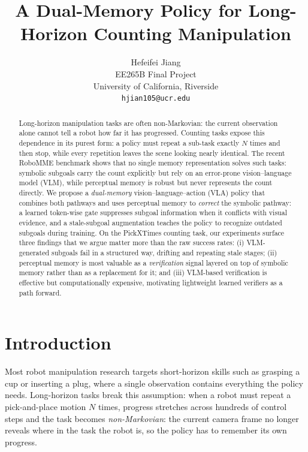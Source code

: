 \documentclass{article}
\title{A Dual-Memory Policy for Long-Horizon Counting Manipulation}
\author{
  Hefeifei Jiang\\
  EE265B Final Project\\
  University of California, Riverside\\
  \texttt{hjian105@ucr.edu}
}
\begin{document}
\maketitle


\begin{abstract}
Long-horizon manipulation tasks are often non-Markovian: the current observation alone cannot tell a robot how far it has progressed. Counting tasks expose this dependence in its purest form: a policy must repeat a sub-task exactly $N$ times and then stop, while every repetition leaves the scene looking nearly identical. The recent RoboMME benchmark shows that no single memory representation solves such tasks: symbolic subgoals carry the count explicitly but rely on an error-prone vision--language model (VLM), while perceptual memory is robust but never represents the count directly. We propose a \emph{dual-memory} vision--language--action (VLA) policy that combines both pathways and uses perceptual memory to \emph{correct} the symbolic pathway: a learned token-wise gate suppresses subgoal information when it conflicts with visual evidence, and a stale-subgoal augmentation teaches the policy to recognize outdated subgoals during training. On the PickXTimes counting task, our experiments surface three findings that we argue matter more than the raw success rates: (i) VLM-generated subgoals fail in a structured way, drifting and repeating stale stages; (ii) perceptual memory is most valuable as a \emph{verification} signal layered on top of symbolic memory rather than as a replacement for it; and (iii) VLM-based verification is effective but computationally expensive, motivating lightweight learned verifiers as a path forward.
\end{abstract}


\section{Introduction}
\label{sec:intro}

Most robot manipulation research targets short-horizon skills such as grasping a cup or inserting a plug, where a single observation contains everything the policy needs. Long-horizon tasks break this assumption: when a robot must repeat a pick-and-place motion $N$ times, progress stretches across hundreds of control steps and the task becomes \emph{non-Markovian}: the current camera frame no longer reveals where in the task the robot is, so the policy has to remember its own progress.
\end{document}

